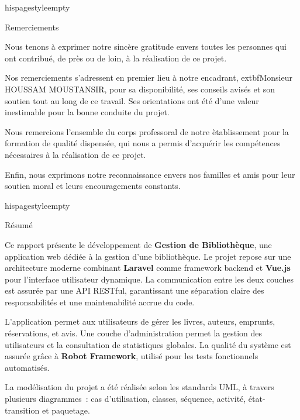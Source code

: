 ﻿\documentclass[12pt,a4paper]{report}
\begin{document}
	hispagestyle{empty}
{}
\begin{center}{\LARGE Remerciements}\end{center}

Nous tenons \`a exprimer notre sinc\`ere gratitude envers toutes les personnes qui ont
contribu\'e, de pr\`es ou de loin, \`a la r\'ealisation de ce projet.

Nos remerciements s'adressent en premier lieu \`a notre encadrant,
	extbf{Monsieur HOUSSAM MOUSTANSIR}, pour sa disponibilit\'e, ses conseils avis\'es
et son soutien tout au long de ce travail. Ses orientations ont \'et\'e d'une valeur
inestimable pour la bonne conduite du projet.

Nous remercions \egalement l'ensemble du corps professoral de notre \`etablissement
pour la formation de qualit\'e dispens\'ee, qui nous a permis d'acqu\'erir les
comp\'etences n\'ecessaires \`a la r\'ealisation de ce projet.

Enfin, nous exprimons notre reconnaissance envers nos familles et amis pour leur
soutien moral et leurs encouragements constants.

\clearpage

	hispagestyle{empty}
{}
\begin{center}{\LARGE R\'esum\'e}\end{center}

Ce rapport pr\'esente le d\'eveloppement de \textbf{Gestion de Biblioth\`eque}, une application web
d\'edi\'ee \`a la gestion d'une biblioth\`eque. Le projet repose sur une architecture
moderne combinant \textbf{Laravel} comme framework backend et \textbf{Vue.js} pour
l'interface utilisateur dynamique. La communication entre les deux couches est assur\'ee
par une API RESTful, garantissant une s\'eparation claire des responsabilit\'es et une
maintenabilit\'e accrue du code.

L'application permet aux utilisateurs de g\'erer les livres, auteurs, emprunts, r\'eservations,
et avis. Une couche d'administration permet la gestion des utilisateurs et la consultation
de statistiques globales. La qualit\'e du syst\`eme est assur\'ee gr\^ace \`a \textbf{Robot Framework},
utilis\'e pour les tests fonctionnels automatis\'es.

La mod\'elisation du projet a \'et\'e r\'ealis\'ee selon les standards UML, \`a
travers plusieurs diagrammes~: cas d'utilisation, classes, s\'equence, activit\'e,
\'etat-transition et paquetage.
\end{document}
